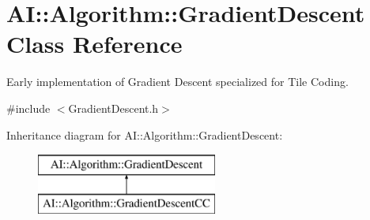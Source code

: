 \hypertarget{classAI_1_1Algorithm_1_1GradientDescent}{\section{A\+I\+:\+:Algorithm\+:\+:Gradient\+Descent Class Reference}
\label{classAI_1_1Algorithm_1_1GradientDescent}
}


Early implementation of Gradient Descent specialized for Tile Coding.  




{\ttfamily \#include $<$Gradient\+Descent.\+h$>$}

Inheritance diagram for A\+I\+:\+:Algorithm\+:\+:Gradient\+Descent\+:\begin{figure}[H]
\begin{center}
\leavevmode
\includegraphics[height=2.000000cm]{classAI_1_1Algorithm_1_1GradientDescent}
\end{center}
\end{figure}
